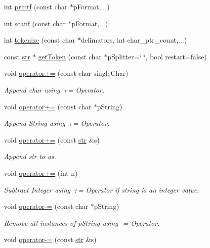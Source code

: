 \begin{DoxyCompactItemize}
int \hyperlink{classstr_adcca272f043d0d6622019fcf722277b6}{printf} (const char $\ast$p\+Format,...)
\item 
int \hyperlink{classstr_ae2d29bc4d8f0945aeb83abf6a11d08f5}{scanf} (const char $\ast$p\+Format,...)
\item 
int \hyperlink{classstr_ad9db6da1cda4feb99ccda4ce46220e01}{tokenize} (const char $\ast$delimators, int char\+\_\+ptr\+\_\+count,...)
\item 
const \hyperlink{classstr}{str} $\ast$ \hyperlink{classstr_a2d172c26f610a130a8aa77427de4f9bc}{get\+Token} (const char $\ast$p\+Splitter=\char`\"{} \char`\"{}, bool restart=false)
\item 
void \hyperlink{classstr_aac62bf43eaa1ed364283202b89afadbe}{operator+=} (const char single\+Char)
\begin{DoxyCompactList}\small\item\em Append char using += Operator. \end{DoxyCompactList}\item 
void \hyperlink{classstr_ab8065080e455e15a5f24818298b3993e}{operator+=} (const char $\ast$p\+String)
\begin{DoxyCompactList}\small\item\em Append String using += Operator. \end{DoxyCompactList}\item 
void \hyperlink{classstr_a49b9a96f116ba180a7e7294eac6539f7}{operator+=} (const \hyperlink{classstr}{str} \&s)
\begin{DoxyCompactList}\small\item\em Append str to us. \end{DoxyCompactList}\item 
void \hyperlink{classstr_ae5aa9f33de7145f93320558b8be54f28}{operator+=} (int n)
\begin{DoxyCompactList}\small\item\em Subtract Integer using += Operator if string is an integer value. \end{DoxyCompactList}\item 
void \hyperlink{classstr_a2ada3fdc9a272d0f03cc34c17e7da288}{operator-\/=} (const char $\ast$p\+String)
\begin{DoxyCompactList}\small\item\em Remove all instances of p\+String using -\/= Operator. \end{DoxyCompactList}\item 
void \hyperlink{classstr_a590cead40b3abfb16ff93c3e97a67197}{operator-\/=} (const \hyperlink{classstr}{str} \&s)

\end{DoxyCompactItemize}
